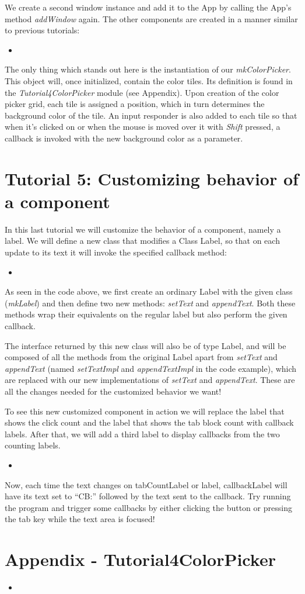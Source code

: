 \documentclass[a4paper]{article}
\newcommand{\timbercode}[2]
  {\begin{itemize}\item[]\end{itemize}}
\begin{document}
We create a second window instance and add it to the App by calling the App's method \textit{addWindow} again. The other components are created in a manner similar to previous tutorials:
\timbercode{tutorial4part0}{}

The only thing which stands out here is the instantiation of our \textit{mkColorPicker}. This object will, once initialized, contain the color tiles. Its definition is found in the \textit{Tutorial4ColorPicker} module (see Appendix). Upon creation of the color picker grid, each tile is assigned a position, which in turn determines the background color of the tile. An input responder is also added to each tile so that when it's clicked on or when the mouse is moved over it with \textit{Shift} pressed, a callback is invoked with the new background color as a parameter.

\section*{Tutorial 5: Customizing behavior of a component}
In this last tutorial we will customize the behavior of a component, namely a label. We will define a new class that modifies a Class Label, so that on each update to its text it will invoke the specified callback method:
\timbercode{tutorial5part0}{}

As seen in the code above, we first create an ordinary Label with the given class (\textit{mkLabel}) and then define two new methods: \textit{setText} and \textit{appendText}. Both these methods wrap their equivalents on the regular label but also perform the given callback.

The interface returned by this new class will also be of type Label, and will be composed of all the methods from the original Label apart from \textit{setText} and \textit{appendText} (named \textit{setTextImpl} and \textit{appendTextImpl} in the code example), which are replaced with our new implementations of \textit{setText} and \textit{appendText}. These are all the changes needed for the customized behavior we want!

To see this new customized component in action we will replace the label that shows the click count and the label that shows the tab block count with callback labels. After that, we will add a third label to display callbacks from the two counting labels.

\timbercode{tutorial5part1}{}

Now, each time the text changes on tabCountLabel or label, callbackLabel will have its text set to ``CB:''  followed by the text sent to the callback. Try running the program and trigger some callbacks by either clicking the button or pressing the tab key while the text area is focused!
\newpage
\section*{Appendix - Tutorial4ColorPicker}
\timbercode{appendixColorPicker}{}
\end{document}
